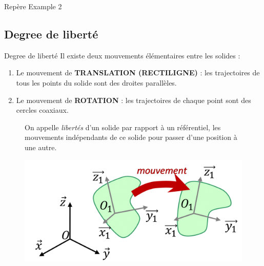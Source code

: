 \documentclass[
  ignorenonframetext,
  aspectratio=169,
  c]{beamer}
\providecommand{\tightlist}{%
  \setlength{\itemsep}{0pt}\setlength{\parskip}{0pt}}\usepackage{longtable,booktabs,array}
\begin{document}
\begin{frame}{Repère}
\label{repuxe8re-2}
Example 2
\end{frame}

\subsection{Degree de liberté}\label{degree-de-libertuxe9}

\begin{frame}{Degree de liberté}
Il existe deux mouvements élémentaires entre les solides :

\begin{enumerate}
\tightlist
\item
  Le mouvement de \textbf{TRANSLATION (RECTILIGNE)} : les trajectoires
  de tous les points du solide sont des droites parallèles.
\item
  Le mouvement de \textbf{ROTATION} : les trajectoires de chaque point
  sont des cercles coaxiaux.
\end{enumerate}

\begin{figure}

\begin{minipage}{0.70\linewidth}
On appelle \emph{libertés} d'un solide par rapport à un référentiel, les
mouvements indépendants de ce solide pour passer d'une position à une
autre.\end{minipage}%
%
\begin{minipage}{0.30\linewidth}
\begin{center}
\includegraphics[width=1\textwidth,height=\textheight]{CM3/Repere-02.png}
\end{center}
\end{minipage}%

\end{figure}%
\end{frame}
\end{document}
